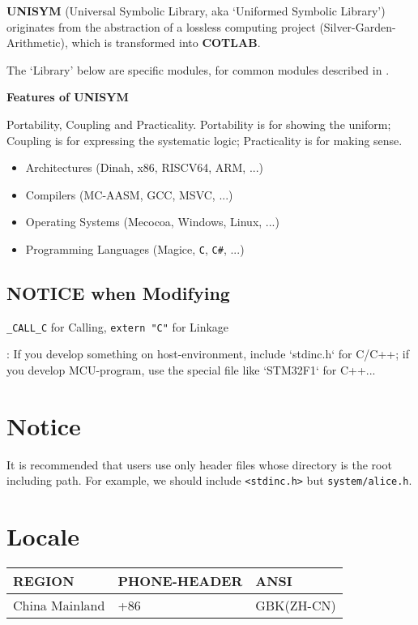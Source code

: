

\textbf{UNISYM} (Universal Symbolic Library, aka `Uniformed Symbolic Library') originates from the abstraction of a lossless computing project (Silver-Garden-Arithmetic), which is transformed into \textbf{COTLAB}.

The `Library' below are specific modules, for common modules described in .

\textbf{Features of UNISYM}

Portability, Coupling and Practicality. Portability is for showing the uniform; Coupling is for expressing the systematic logic; Practicality is for making sense.

\begin{itemize}
	\item Architectures (Dinah, x86, RISCV64, ARM, ...)
	\item Compilers (MC-AASM, GCC, MSVC, ...)
	\item Operating Systems (Mecocoa, Windows, Linux, ...)
	\item Programming Languages (Magice, \verb|C|, \verb|C#|, ...)
\end{itemize}

\subsection{NOTICE when Modifying}

\verb`_CALL_C` for Calling, \verb`extern "C"` for Linkage


:
If you develop something on host-environment, include `stdinc.h` for C/C++;
if you develop MCU-program, use the special file like `STM32F1` for C++...

\section{Notice}

It is recommended that users use only header files whose directory is the root including path. For example, we should include \verb`<stdinc.h>` but \verb|system/alice.h|.


\section{Locale}

\begin{center}\begin{table}[h!]
	\begin{tabular}{|l|l|l|}
	\hline
	\rowcolor[rgb]{0.95, 0.975, 1}\textbf{REGION} & \textbf{PHONE-HEADER} & \textbf{ANSI} \\ \hline
	China Mainland & +86 & GBK(ZH-CN) \\ \hline
	\end{tabular}
\end{table}\end{center}

